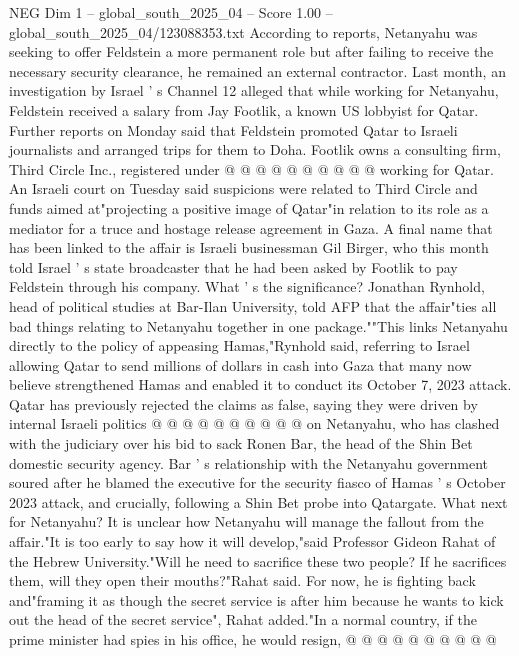 \begin{textsample}{NEG Dim 1 – global\_south\_2025\_04 – Score 1.00 – global\_south\_2025\_04/123088353.txt}
According to reports, Netanyahu was seeking to offer Feldstein a more permanent role but after failing to receive the necessary security clearance, he remained an external contractor.
Last month, an investigation by Israel ' s Channel 12 alleged that while working for Netanyahu, Feldstein received a salary from Jay Footlik, a known US lobbyist for Qatar.
Further reports on Monday said that Feldstein promoted Qatar to Israeli journalists and arranged trips for them to Doha.
Footlik owns a consulting firm, Third Circle Inc., registered under @ @ @ @ @ @ @ @ @ @ working for Qatar.
An Israeli court on Tuesday said suspicions were related to Third Circle and funds aimed at"projecting a positive image of Qatar"in relation to its role as a mediator for a truce and hostage release agreement in Gaza.
A final name that has been linked to the affair is Israeli businessman Gil Birger, who this month told Israel ' s state broadcaster that he had been asked by Footlik to pay Feldstein through his company.
What ' s the significance?
Jonathan Rynhold, head of political studies at Bar-Ilan University, told AFP that the affair"ties all bad things relating to Netanyahu together in one package.""This links Netanyahu directly to the policy of appeasing Hamas,"Rynhold said, referring to Israel allowing Qatar to send millions of dollars in cash into Gaza that many now believe strengthened Hamas and enabled it to conduct its October 7, 2023 attack.
Qatar has previously rejected the claims as false, saying they were driven by internal Israeli politics @ @ @ @ @ @ @ @ @ @ on Netanyahu, who has clashed with the judiciary over his bid to sack Ronen Bar, the head of the Shin Bet domestic security agency.
Bar ' s relationship with the Netanyahu government soured after he blamed the executive for the security fiasco of Hamas ' s October 2023 attack, and crucially, following a Shin Bet probe into Qatargate.
What next for Netanyahu?
It is unclear how Netanyahu will manage the fallout from the affair."It is too early to say how it will develop,"said Professor Gideon Rahat of the Hebrew University."Will he need to sacrifice these two people?
If he sacrifices them, will they open their mouths?"Rahat said.
For now, he is fighting back and"framing it as though the secret service is after him because he wants to kick out the head of the secret service", Rahat added."In a normal country, if the prime minister had spies in his office, he would resign, @ @ @ @ @ @ @ @ @ @

\end{textsample}
